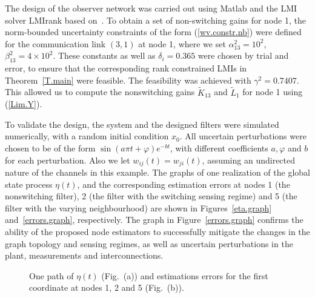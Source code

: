 \documentclass[a4paper,twocolumn]{autart}
\begin{document}
The design of the observer network was carried out using Matlab and the
LMI solver LMIrank based on~\cite{OHM-2006}. To obtain a
set of non-switching gains for node 1, the
norm-bounded uncertainty constraints of the form 
(\ref{wv.constr.nb}) were defined 
for the communication link $(3,1)$ at node 1, where
we set $\alpha_{13}^2=10^2$, $\beta_{13}^2=4\times 10^2$. These constants
as well as $\delta_i=0.365$ were chosen by trial and error, to ensure that the
corresponding rank constrained LMIs in Theorem~\ref{T.main} were
feasible. The feasibility was achieved with
$\gamma^2=0.7407$. This allowed us to compute the nonswitching gains
$\tilde K_{13}$ and $\tilde L_1$  for node 1 using (\ref{Lim.Y}).   

To validate the design, the system and the designed filters were
simulated numerically, with a random initial condition $x_0$. 
All uncertain perturbations were chosen to be of
the form $\sin(a\pi t+\varphi)e^{-bt}$, with different coefficients
$a,\varphi$ and $b$ for each perturbation. Also we let
$w_{ij}(t)=w_{ji}(t)$, assuming an undirected nature of the 
channels in this example.  
The graphs of one realization 
of the global state process $\eta(t)$, and the corresponding estimation
errors at nodes 1 (the nonswitching filter), 2 (the filter with the switching
sensing regime) and 5 (the filter with the varying neighbourhood) are
shown in Figures~\ref{eta.graph} and~\ref{errors.graph},
respectively. The graph in Figure~\ref{errors.graph} confirms the
ability of the 
proposed node estimators to successfully mitigate the 
changes in the graph topology and sensing
regimes, as well as uncertain perturbations in the plant, measurements and
interconnections. 

  \begin{figure}
\centering
{}
  \caption{One path of $\eta(t)$ (Fig.~(a)) and estimations errors for the
    first coordinate at nodes 1, 2 and 5 (Fig.~(b)).} 
\end{figure}
 
 
\end{document}

